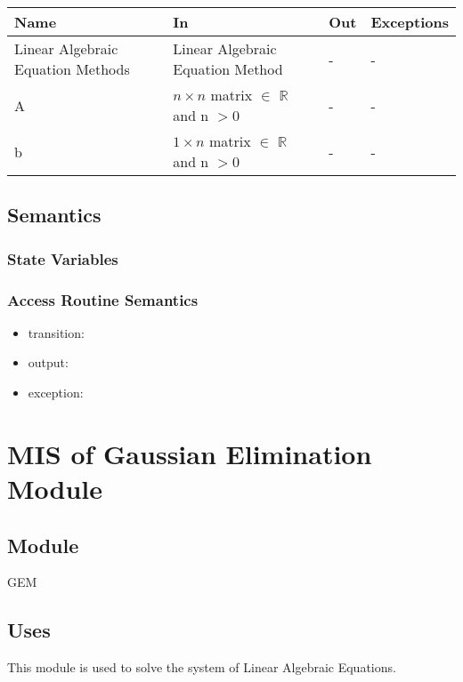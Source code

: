 \documentclass[12pt, titlepage]{article}
\begin{document}
\begin{center}
\begin{tabular}{p{2cm} p{4cm} p{4cm} p{2cm}}
\hline
\textbf{Name} & \textbf{In} & \textbf{Out} & \textbf{Exceptions} \\
\hline
Linear Algebraic Equation Methods & Linear Algebraic Equation Method & - & - \\
A & $n \times n$ matrix $\in$ $\mathbb{R}$ and n $> 0$ & - & - \\
b & $1 \times n$ matrix $\in$ $\mathbb{R}$ and n $> 0$ & - & - \\
\hline
\end{tabular}
\end{center}

\subsection{Semantics}

\subsubsection{State Variables}


\subsubsection{Access Routine Semantics}

\noindent %
\begin{itemize}
\item transition: %
\item output: %
\item exception: %
\end{itemize}

\section{MIS of {Gaussian Elimination  Module}} \label{gem}

\subsection{Module}

GEM


\subsection{Uses}
This module is used to solve the system of Linear Algebraic Equations.
\end{document}
